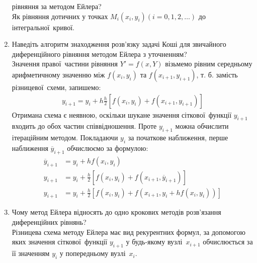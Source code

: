 \begin{enumerate}
            рівняння за методом Ейлера? \\
            Як рівняння дотичних у точках $M_i (x_i, y_i) (i = 0, 1, 2, \dots)$
            до інтегральної кривої.
      \item Наведіть алгоритм знаходження розв’язку задачі Коші для
            звичайного диференційного рівняння методом Ейлера з уточненням? \\
            Значення правої частини рівняння $Y' = f(x, Y)$ візьмемо рівним
            середньому арифметичному значенню між $f(x_i, y_i)$ та $f(x_{i + 1}, y_{i + 1})$,
            т. б. замість різницевої схеми, запишемо:
            \begin{align}
                  y_{i + 1} = y_i + h \frac{h}{2}[f(x_i, y_i) + f(x_{i + 1}, y_{i + 1})]
            \end{align}
            Отримана схема є неявною, оскільки шукане значення сіткової функції
            $y_{i + 1}$ входить до обох частин співвідношення. Проте $y_{i + 1}$
            можна обчислити ітераційним методом. Покладаючи $y_i$ за початкове наближення,
            перше наближення $\overline{y}_{i + 1}$ обчислюємо за формулою:
            \begin{align}
                  \overline{y}_{i + 1} & = y_i + h f(x_i, y_i)                                                 \\
                  y_{i + 1}            & = y_i + \frac{h}{2}[f(x_i, y_i) + f(x_{i + 1}, \overline{y}_{i + 1})] \\
                  y_{i + 1}            & = y_i + \frac{h}{2}[f(x_i, y_i) + f(x_{i + 1}, y_i + h f(x_i, y_i))]
            \end{align}
      \item Чому метод Ейлера відносять до одно крокових
            методів розв’язання диференційних рівнянь? \\
            Різницева схема методу Ейлера має вид рекурентних формул,
            за допомогою яких значення сіткової функції $y_{i + 1}$
            у будь-якому вузлі $x_{i + 1}$ обчислюється за її значенням
            $y_i$ у попередньому вузлі $x_i$.
\end{enumerate}
